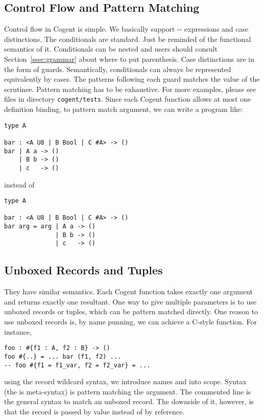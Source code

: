 \documentclass[a4paper]{article}
\newcommand{\cogent}{Cogent\xspace}
\begin{document}
\subsection{Control Flow and Pattern Matching}
Control flow in \cogent is simple. We basically support --
expressions and case distinctions. The conditionals are standard. Just be reminded of the
functional semantics of it. Conditionals can be nested and users should consult Section~\ref{ssec:grammar} about where to put parenthesis. Case distinctions are in the form
of guards. Semantically, conditionals can always be represented equivalently by cases.
The patterns following each guard matches the value of the scrutinee. Pattern matching has
to be exhaustive. For more examples, please see files in directory \texttt{cogent/tests}.
Since each \cogent function allows at most one definition binding, to pattern match argument, we can write
a program like:
\begin{lstlisting}[language=Cogent]
type A

bar : <A U8 | B Bool | C #A> -> ()
bar | A a -> ()
    | B b -> ()
    | c   -> ()
\end{lstlisting}
instead of
\begin{lstlisting}[language=Cogent]
type A

bar : <A U8 | B Bool | C #A> -> ()
bar arg = arg | A a -> ()
              | B b -> ()
              | c   -> ()
\end{lstlisting}


\subsection{Unboxed Records and Tuples} They have similar semantics.
Each \cogent function takes exactly one argument and returns exactly one resultant.
One way to give multiple parameters is to use unboxed records or tuples, which can be
pattern matched directly. One reason to use unboxed records is, by name punning,
we can achieve a C-style function. For instance,
\begin{lstlisting}[language=Cogent]
foo : #{f1 : A, f2 : B} -> ()
foo #{..} = ... bar (f1, f2) ...
-- foo #{f1 = f1_var, f2 = f2_var} = ...
\end{lstlisting}
using the record wildcard syntax, we introduce names  and 
into scope. Syntax  (the  is meta-syntax) is
pattern matching the argument. The commented line is the general syntax to match
an unboxed record. The downside of it, however, is that the record is passed by value
instead of by reference.
\end{document}
